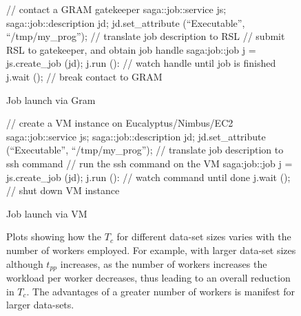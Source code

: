 \documentclass[conference,final]{IEEEtran}
\newcommand{\tc }{ $T_c$ }
\newcommand{\upp}{\vspace*{-0.5em}}
\begin{document}
\begin{figure}[!ht]
\upp 
 \begin{center}
  \begin{mycode}[label=SAGA Job Launch via GRAM gatekeeper]
  { // contact a GRAM gatekeeper
    saga::job::service     js;
    saga::job::description jd;
    jd.set_attribute (``Executable'', ``/tmp/my_prog'');
    // translate job description to RSL
    // submit RSL to gatekeeper, and obtain job handle
    saga:job::job j = js.create_job (jd);
    j.run ():
    // watch handle until job is finished
    j.wait ();
   } // break contact to GRAM
  \end{mycode}
  \caption{\label{gramjob}Job launch via Gram }
 \end{center}
\upp
\end{figure}

\begin{figure}[!ht]
\upp
 \begin{center}
  \begin{mycode}[label=SAGA create a VM instance on a Cloud]
   {// create a VM instance on Eucalyptus/Nimbus/EC2
    saga::job::service     js;
    saga::job::description jd;
    jd.set_attribute (``Executable'', ``/tmp/my_prog'');
    // translate job description to ssh command
    // run the ssh command on the VM
    saga:job::job j = js.create_job (jd);
    j.run ():
    // watch command until done
    j.wait ();
   } // shut down VM instance
  \end{mycode}
  \caption{\label{vmjob} Job launch via VM}
 \end{center}
\upp
\end{figure}

\begin{figure}[t]
  \caption{Plots showing how the \tc for different data-set sizes
    varies with the number of workers employed.  For example, with
    larger data-set sizes although $t_{pp}$ increases, as the number
    of workers increases the workload per worker decreases, thus
    leading to an overall reduction in $T_c$. The advantages of a
    greater number of workers is manifest for larger data-sets.}
\label{grids1}
\end{figure}
\end{document}
